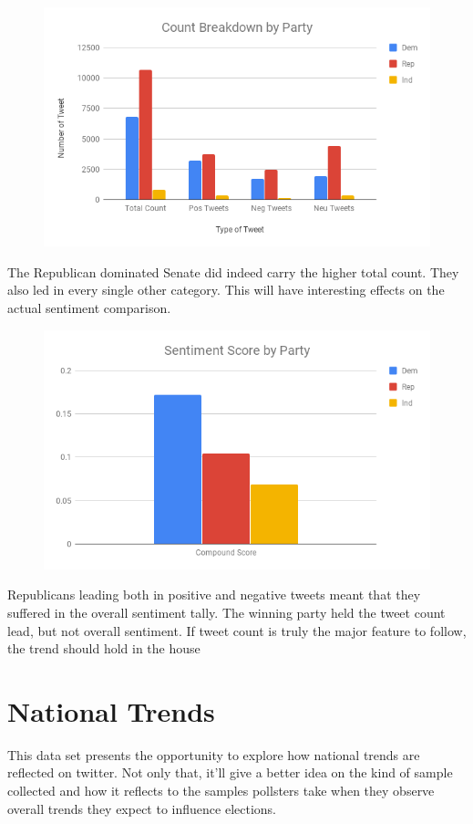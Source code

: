 \documentclass[11pt, twoside, reqno]{book}
\begin{document}
\begin{figure}[H]
\centering
	\includegraphics[scale=0.5]{count_party_senate}	
\end{figure}

The Republican dominated Senate did indeed carry the higher total count. They also led in every single other category. This will have interesting effects on the actual sentiment comparison.

\begin{figure}[H]
\centering
	\includegraphics[scale=0.5]{party_sent}
\end{figure}

Republicans leading both in positive and negative tweets meant that they suffered in the overall sentiment tally. The winning party held the tweet count lead, but not overall sentiment. If tweet count is truly the major feature to follow, the trend should hold in the house 

\section{National Trends}
\hspace{0.2in} This data set presents the opportunity to explore how national trends are reflected on twitter. Not only that, it'll give a better idea on the kind of sample collected and how it reflects to the samples pollsters take when they observe overall trends they expect to influence elections. 
\end{document}
